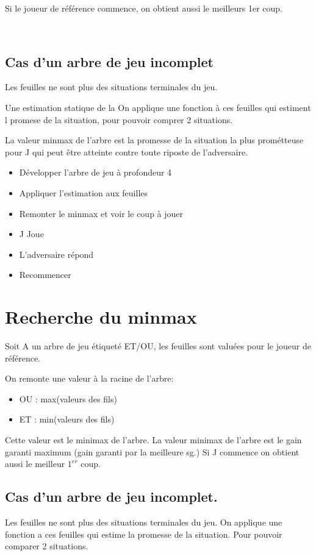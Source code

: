 \documentclass[12pt,a4paper,openany]{book}
\begin{document}
	\begin{remarque}
		Si le joueur de référence commence, on obtient aussi le meilleurs 1er coup.

~
	\end{remarque}
	
	\subsection{Cas d'un arbre de jeu incomplet}
	\begin{attention}
		Les feuilles ne sont plus des situations terminales du jeu.
	\end{attention}

	Une estimation statique de la On applique une fonction à ces feuilles qui estiment l promese de la situation, pour pouvoir comprer 2 situations.
	
	La valeur minmax de l'arbre est la promesse de la situation la plus prométteuse pour J qui peut être atteinte contre toute riposte de
	l'adversaire.
	
\begin{itemize}
	\item Développer l'arbre de jeu à profondeur 4
	\item Appliquer l'estimation aux feuilles
	\item Remonter le minmax et voir le coup à jouer
	\item J Joue
	\item L'adversaire répond
	\item Recommencer
\end{itemize}

\section{Recherche du minmax}
Soit A un arbre de jeu étiqueté ET/OU, les feuilles sont valuées pour le joueur de référence.

On remonte une valeur à la racine de l'arbre:
\begin{itemize}
\item OU : max(valeurs des fils) 
\item ET : min(valeurs des fils)
\end{itemize}

Cette valeur est le minimax de l'arbre.  La valeur minimax de l'arbre est le gain garanti maximum (gain garanti par la meilleure sg.)
Si J commence on obtient aussi le meilleur $1^{er}$ coup.

\subsection{Cas d'un arbre de jeu incomplet.}
Les feuilles ne sont plus des situations terminales du jeu. On applique une fonction a ces feuilles qui estime la promesse de la situation. Pour pouvoir comparer 2 situations.
\end{document}
